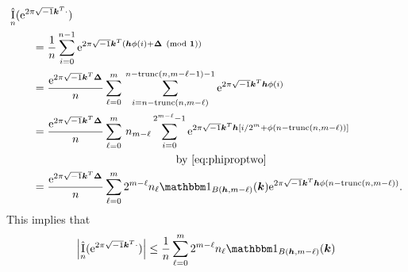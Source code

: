 \documentclass{amsart}
\DeclareMathOperator{\appxint}{\hat{I}}
\DeclareMathOperator{\trun}{trunc}
\begin{document}
\begin{align*}
    \MoveEqLeft{\appxint_{n}(\me^{2 \pi \sqrt{-1} \vk^T \cdot}) } \\
    &= \frac 1{n} \sum_{i=0}^{n-1} \me^{2 \pi \sqrt{-1} \vk^T (\vh\phi(i) + \vDelta \pmod{\vone})} \\
    \nonumber
    &= \frac {\me^{2 \pi \sqrt{-1} \vk^T \vDelta}}{n} \sum_{\ell = 0}^{m} \,
    \sum_{i=n - \trun(n,m-\ell) }^{n - \trun(n,m-\ell-1)  -1} \me^{2 \pi \sqrt{-1} \vk^T \vh\phi(i)} \\
    &= \frac {\me^{2 \pi \sqrt{-1} \vk^T \vDelta}}{n} \sum_{\ell = 0}^{m} \, n_{m-\ell}
    \sum_{i=0 }^{2^{m-\ell}  -1} \me^{2 \pi \sqrt{-1} \vk^T \vh[i/2^m + \phi(n - \trun(n,m-\ell))]} \\
    & \hspace{30ex} \text{by \eqref{eq:phiproptwo}} \\
    & = \frac {\me^{2 \pi \sqrt{-1} \vk^T \vDelta}}{n} \sum_{\ell = 0}^{m} 2^{m-\ell} n_\ell \bbone_{B(\vh,m-\ell)}(\vk) \me^{2 \pi \sqrt{-1} \vk^T \vh\phi(n - \trun(n,m-\ell))}.
\end{align*}
This implies that
\begin{equation} \label{eq:ihatarbn}
    \abs{\appxint_{n}(\me^{2 \pi \sqrt{-1} \vk^T \cdot})} \le \frac {1}{n} \sum_{\ell = 0}^{m} 2^{m-\ell} n_\ell \bbone_{B(\vh,m-\ell)}(\vk)
\end{equation}
\end{document}

